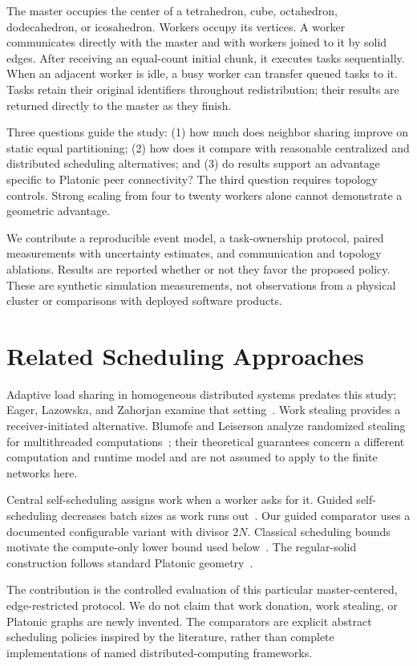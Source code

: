 \documentclass[10pt,journal,twocolumn]{IEEEtran}
\begin{document}
The master occupies the center of a tetrahedron, cube, octahedron, dodecahedron, or icosahedron. Workers occupy its vertices. A worker communicates directly with the master and with workers joined to it by solid edges. After receiving an equal-count initial chunk, it executes tasks sequentially. When an adjacent worker is idle, a busy worker can transfer queued tasks to it. Tasks retain their original identifiers throughout redistribution; their results are returned directly to the master as they finish.

Three questions guide the study: (1) how much does neighbor sharing improve on static equal partitioning; (2) how does it compare with reasonable centralized and distributed scheduling alternatives; and (3) do results support an advantage specific to Platonic peer connectivity? The third question requires topology controls. Strong scaling from four to twenty workers alone cannot demonstrate a geometric advantage.

We contribute a reproducible event model, a task-ownership protocol, paired measurements with uncertainty estimates, and communication and topology ablations. Results are reported whether or not they favor the proposed policy. These are synthetic simulation measurements, not observations from a physical cluster or comparisons with deployed software products.

\section{Related Scheduling Approaches}
Adaptive load sharing in homogeneous distributed systems predates this study; Eager, Lazowska, and Zahorjan examine that setting~\cite{eager}. Work stealing provides a receiver-initiated alternative. Blumofe and Leiserson analyze randomized stealing for multithreaded computations~\cite{blumofe}; their theoretical guarantees concern a different computation and runtime model and are not assumed to apply to the finite networks here.

Central self-scheduling assigns work when a worker asks for it. Guided self-scheduling decreases batch sizes as work runs out~\cite{guided}. Our guided comparator uses a documented configurable variant with divisor $2N$. Classical scheduling bounds motivate the compute-only lower bound used below~\cite{graham}. The regular-solid construction follows standard Platonic geometry~\cite{coxeter}.

The contribution is the controlled evaluation of this particular master-centered, edge-restricted protocol. We do not claim that work donation, work stealing, or Platonic graphs are newly invented. The comparators are explicit abstract scheduling policies inspired by the literature, rather than complete implementations of named distributed-computing frameworks.
\end{document}
